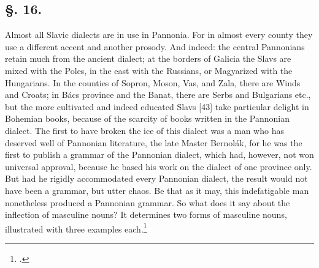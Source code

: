 \subsection*{\hspace*{\fill}§. 16.\hspace*{\fill}}

Almost all Slavic dialects are in use in Pannonia. For in almost every county they use a different accent and another prosody. And indeed: the central Pannonians retain much from the ancient dialect; at the borders of Galicia the Slavs are mixed with the Poles, in the east with the Russians, or Magyarized with the Hungarians. In the counties of Sopron, Moson, Vas, and Zala, there are Winds and Croats; in Bács province and the Banat, there are Serbs and Bulgarians etc., but the more cultivated and indeed educated Slavs [43] take particular delight in Bohemian books, because of the scarcity of books written in the Pannonian dialect. The first to have broken the ice of this dialect was a man who has deserved well of Pannonian literature, the late Master Bernolák, for he was the first to publish a grammar of the Pannonian dialect, which had, however, not won universal approval, because he based his work on the dialect of one province only. But had he rigidly accommodated every Pannonian dialect, the result would not have been a grammar, but utter chaos. Be that as it may, this indefatigable man nonetheless produced a Pannonian grammar. So what does it say about the inflection of masculine nouns? It determines two forms of masculine nouns, illustrated with three examples each.\footnote{{\citet[27--28]{bernolak_grammatica_1790}}.}

